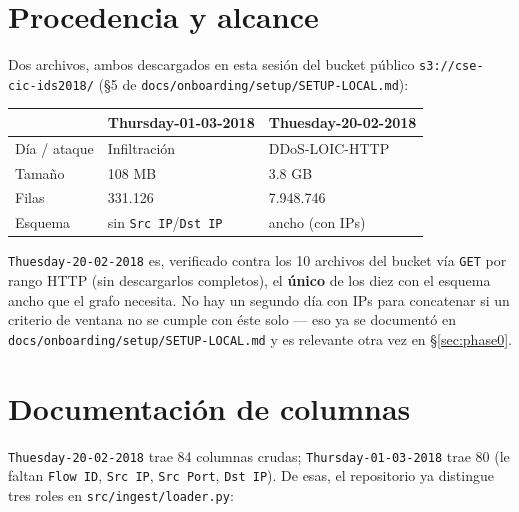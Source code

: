 \documentclass[11pt]{article}
\newcommand{\code}[1]{\texttt{\small #1}}
\begin{document}
\section{Procedencia y alcance}

Dos archivos, ambos descargados en esta sesión del bucket público
\code{s3://cse-cic-ids2018/} (\S5 de \code{docs/onboarding/setup/SETUP-LOCAL.md}):

\begin{center}
\begin{tabular}{@{}lll@{}}
\toprule
& \textbf{Thursday-01-03-2018} & \textbf{Thuesday-20-02-2018} \\
\midrule
Día / ataque & Infiltración & DDoS-LOIC-HTTP \\
Tamaño & 108 MB & 3.8 GB \\
Filas & 331.126 & 7.948.746 \\
Esquema & sin \code{Src IP}/\code{Dst IP} & ancho (con IPs) \\
\bottomrule
\end{tabular}
\end{center}

\code{Thuesday-20-02-2018} es, verificado contra los 10 archivos del bucket vía \code{GET}
por rango HTTP (sin descargarlos completos), el \textbf{único} de los diez con el esquema
ancho que el grafo necesita. No hay un segundo día con IPs para concatenar si un criterio
de ventana no se cumple con éste solo --- eso ya se documentó en
\code{docs/onboarding/setup/SETUP-LOCAL.md} y es relevante otra vez en \S\ref{sec:phase0}.

\section{Documentación de columnas}

\code{Thuesday-20-02-2018} trae 84 columnas crudas; \code{Thursday-01-03-2018} trae 80
(le faltan \code{Flow ID}, \code{Src IP}, \code{Src Port}, \code{Dst IP}). De esas, el
repositorio ya distingue tres roles en \code{src/ingest/loader.py}:
\end{document}
